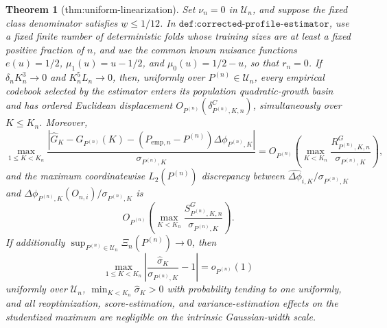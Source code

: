 \documentclass{article}
\newtheorem{theorem}{Theorem}
\begin{document}
\begin{theorem}[thm:uniform-linearization]\label{thm:uniform-linearization}
Set \(\nu_n=0\) in \(\mathcal U_n\), and suppose the fixed class denominator satisfies \(\underline w\leq1/12\).  In \(\texttt{def:corrected-profile-estimator}\), use a fixed finite number of deterministic folds whose training sizes are at least a fixed positive fraction of \(n\), and use the common known nuisance functions \(e(u)=1/2\), \(\mu_1(u)=u-1/2\), and \(\mu_0(u)=1/2-u\), so that \(r_n=0\).  If \(\delta_nK_n^3\to0\) and \(K_n^5L_n\to0\), then, uniformly over \(P^{(n)}\in\mathcal U_n\), every empirical codebook selected by the estimator enters its population quadratic-growth basin and has ordered Euclidean displacement \(O_{P^{(n)}}(\delta^C_{P^{(n)},K,n})\), simultaneously over \(K\leq K_n\).  Moreover,
\[
 \max_{1\leq K<K_n}\frac{|\widehat G_K-G_{P^{(n)}}(K)-(P_{\mathrm{emp},n}-P^{(n)})\Delta\phi_{P^{(n)},K}|}{\sigma_{P^{(n)},K}}
 =O_{P^{(n)}}\!\left(\max_{K<K_n}\frac{R^G_{P^{(n)},K,n}}{\sigma_{P^{(n)},K}}\right),
\]
and the maximum coordinatewise \(L_2(P^{(n)})\) discrepancy between \(\widehat{\Delta\phi}_{i,K}/\sigma_{P^{(n)},K}\) and \(\Delta\phi_{P^{(n)},K}(O_{n,i})/\sigma_{P^{(n)},K}\) is
\[
 O_{P^{(n)}}\!\left(\max_{K<K_n}\frac{S^G_{P^{(n)},K,n}}{\sigma_{P^{(n)},K}}\right).
\]
If additionally \(\sup_{P^{(n)}\in\mathcal U_n}\Xi_n(P^{(n)})\to0\), then
\[
 \max_{1\leq K<K_n}\left|\frac{\widehat\sigma_K}{\sigma_{P^{(n)},K}}-1\right|=o_{P^{(n)}}(1)
\]
uniformly over \(\mathcal U_n\), \(\min_{K<K_n}\widehat\sigma_K>0\) with probability tending to one uniformly, and all reoptimization, score-estimation, and variance-estimation effects on the studentized maximum are negligible on the intrinsic Gaussian-width scale.
\end{theorem}
\end{document}

